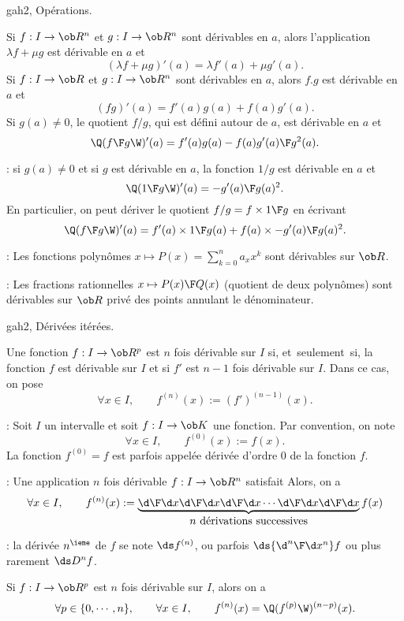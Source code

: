 \Subsection gah2, Op\'erations. 

Si $f:I\to\ob R^n$ et $g:I\to\ob R^n$ sont d\'erivables en $a$, alors l'application $\lambda f+\mu g$ est d\'erivable en $a$ et 
$$
(\lambda f+\mu g)'(a)=\lambda f'(a)+\mu g'(a). 
$$
Si $f:I\to\ob R$ et $g:I\to\ob R^n$ sont d\'erivables en $a$, alors $f.g$ est d\'erivable en $a$ et
$$
(fg)'(a)=f'(a)g(a)+f(a)g'(a).
$$
Si $g(a)\neq 0$, le quotient $f/g$, qui est d\'efini autour de $a$, est d\'erivable en $a$ et 
$$
\Q({f\F g}\W)'(a)={f'(a)g(a)-f(a)g'(a)\F g^2(a)}.
$$

\Remarque : si $g(a)\neq0$ et si $g$ est d\'erivable en $a$, la fonction $1/g$ est d\'erivable en $a$ et 
$$
\Q({1\F g}\W)'(a)=-{g'(a)\F g(a)^2}.
$$
En particulier, on peut d\'eriver le quotient $f/g=f\times{1\F g}$ en \'ecrivant 
$$
\Q({f\F g}\W)'(a)=f'(a)\times {1\F g(a)}+f(a)\times{-g'(a)\F g(a)^2}.
$$

\Remarque : Les fonctions polyn\^omes $x\mapsto P(x)=\sum_{k=0}^n a_xx^k$ sont d\'erivables sur $\ob R$. 
\bigskip

\Remarque  : Les fractions rationnelles $x\mapsto {P(x)\F Q(x)}$ (quotient de deux polyn\^omes) sont d\'erivables sur $\ob R$ priv\'e des points annulant le d\'enominateur. 
\bigskip


\Subsection gah2, D\'eriv\'ees it\'er\'ees. 

\Definition [$I$ intervalle, $n\ge2$] 
Une fonction $f:I\to\ob R^p$ est $n$ fois d\'erivable sur $I$ si, et~seulement~si, la fonction $f$ est d\'erivable sur $I$ et si $f'$ est $n-1$ fois 
d\'erivable sur $I$. Dans ce cas, on pose 
$$
\forall x\in I,\qquad f^{(n)}(x):=(f')^{(n-1)}(x). 
$$


\Remarque : Soit $I$ un intervalle et soit $f:I\to\ob K$ une fonction. Par convention, on note 
$$
\forall x\in I, \qquad f^{(0)}(x):=f(x).
$$
La fonction $f^{(0)}=f$ est parfois appel\'ee d\'eriv\'ee d'ordre $0$ de la fonction $f$. 
\bigskip

\Remarque : Une application $n$ fois d\'erivable $f:I\to\ob R^n$ satisfait 
Alors, on a 
$$
\forall x\in I, \qquad f^{(n)}(x):=\underbrace{{\d\F \d x}{\d\F\d x}{\d\F \d x}\cdots{\d\F \d x}{\d\F \d x}}_{\mbox{$n$ d\'erivations successives}}f(x)
$$

\Remarque : la d\'eriv\'ee $n^\ieme$ de $f$ se note $\ds f^{(n)}$, ou parfois $\ds{\d^n\F\d x^n}f$ ou plus rarement $\ds D^nf$. 
\bigskip

\Propriete [$I$ intervalle, $n\ge2$]
Si $f:I\to\ob R^p$ est $n$ fois d\'erivable sur $I$, alors on a 
$$
\forall p\in\{0,\cdots, n\}, \qquad \forall x\in I, \qquad f^{(n)}(x)=\Q(f^{(p)}\W)^{(n-p)}(x).
$$

